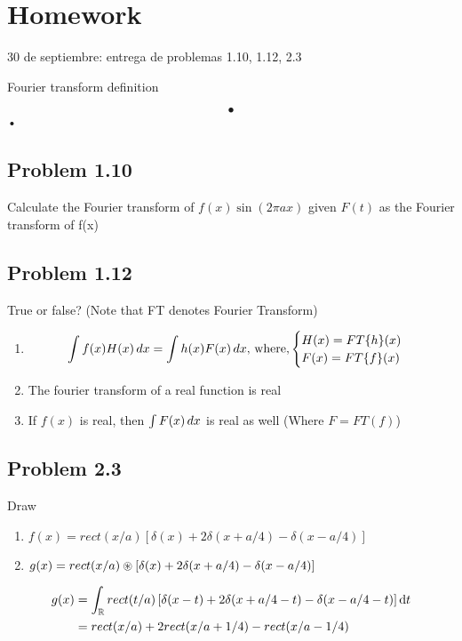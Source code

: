 \documentclass[../main/main.tex]{subfiles}
\begin{document}
\section{Homework}

30 de septiembre: entrega de problemas 1.10, 1.12, 2.3

Fourier transform definition

\begin{equation}
•
\end{equation}•

\subsection*{Problem 1.10}

Calculate the Fourier transform of $f(x) \sin (2\pi a x)$ given $F(t)$ as the Fourier transform of f(x)
\subsection*{Problem 1.12}

True or false? (Note that FT denotes Fourier Transform)

\begin{enumerate}
	\item
	\begin{equation*}
	\int f(x)H(x)\mathop{dx} = \int h(x)F(x)\mathop{dx},\,\textrm{where,}
	\begin{cases}
	H(x) = FT\{h\}(x)\\
	F(x) = FT\{f\}(x)
	\end{cases}
	\end{equation*}
	\item The fourier transform of a real function is real
	\item If $f(x)$ is real, then $\int F(x)\mathop{dx}$ is real as well (Where $F = FT(f)$)
\end{enumerate}

\subsection*{Problem 2.3}

Draw
\begin{enumerate}
	\item $f(x) = rect(x/a) \left[\delta(x) + 2\delta(x+a/4) - \delta(x-a/4)\right]$
	\item $g(x) = rect(x/a)\circledast \left[\delta(x) + 2\delta(x+a/4) - \delta(x-a/4)\right]$
\end{enumerate}

\begin{align*}
g(x)
&= \int_{\mathbb{R}}rect(t/a)\left[\delta(x-t) + 2\delta(x+a/4-t) - \delta(x-a/4-t)\right]\dd{t}\\
&= \mathop{rect}(x/a) + 2 rect(x/a+1/4) - rect(x/a-1/4)
\end{align*}
\end{document}
